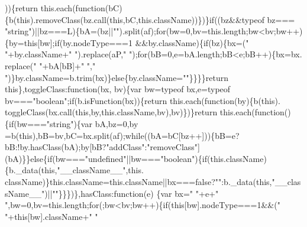 \begin{DoxyCode}
      ))\{\textcolor{keywordflow}{return} this.each(\textcolor{keyword}{function}(bC)\{b(\textcolor{keyword}{this}).removeClass(bz.call(\textcolor{keyword}{this},bC,\textcolor{keyword}{this}.className))\})\}\textcolor{keywordflow}{if}((bz&&typeof bz===\textcolor{stringliteral}{
      "string"})||bz===L)\{bA=(bz||\textcolor{stringliteral}{""}).split(af);\textcolor{keywordflow}{for}(bw=0,bv=this.length;bw<bv;bw++)\{by=\textcolor{keyword}{this}[bw];\textcolor{keywordflow}{if}(by.nodeType===1
      &&by.className)\{\textcolor{keywordflow}{if}(bz)\{bx=(\textcolor{stringliteral}{" "}+by.className+\textcolor{stringliteral}{" "}).replace(aP,\textcolor{stringliteral}{" "});\textcolor{keywordflow}{for}(bB=0,e=bA.length;bB<e;bB++)\{bx=bx.
      replace(\textcolor{stringliteral}{" "}+bA[bB]+\textcolor{stringliteral}{" "},\textcolor{stringliteral}{" "})\}by.className=b.trim(bx)\}\textcolor{keywordflow}{else}\{by.className=\textcolor{stringliteral}{""}\}\}\}\}\textcolor{keywordflow}{return} \textcolor{keyword}{this}\},toggleClass:\textcolor{keyword}{function}(bx,
      bv)\{var bw=typeof bx,e=typeof bv===\textcolor{stringliteral}{"boolean"};\textcolor{keywordflow}{if}(b.isFunction(bx))\{\textcolor{keywordflow}{return} this.each(\textcolor{keyword}{function}(by)\{b(\textcolor{keyword}{this}).
      toggleClass(bx.call(\textcolor{keyword}{this},by,\textcolor{keyword}{this}.className,bv),bv)\})\}\textcolor{keywordflow}{return} this.each(\textcolor{keyword}{function}()\{\textcolor{keywordflow}{if}(bw===\textcolor{stringliteral}{"string"})\{var bA,bz=0,by
      =b(\textcolor{keyword}{this}),bB=bv,bC=bx.split(af);\textcolor{keywordflow}{while}((bA=bC[bz++]))\{bB=e?bB:!by.hasClass(bA);by[bB?\textcolor{stringliteral}{"addClass"}:\textcolor{stringliteral}{"removeClass"}]
      (bA)\}\}\textcolor{keywordflow}{else}\{\textcolor{keywordflow}{if}(bw===\textcolor{stringliteral}{"undefined"}||bw===\textcolor{stringliteral}{"boolean"})\{\textcolor{keywordflow}{if}(this.className)\{b.\_data(\textcolor{keyword}{this},\textcolor{stringliteral}{"\_\_className\_\_"},this.
      className)\}this.className=this.className||bx===\textcolor{keyword}{false}?\textcolor{stringliteral}{""}:b.\_data(\textcolor{keyword}{this},\textcolor{stringliteral}{"\_\_className\_\_"})||\textcolor{stringliteral}{""}\}\}\})\},hasClass:\textcolor{keyword}{function}(e)
      \{var bx=\textcolor{stringliteral}{" "}+e+\textcolor{stringliteral}{" "},bw=0,bv=this.length;\textcolor{keywordflow}{for}(;bw<bv;bw++)\{\textcolor{keywordflow}{if}(\textcolor{keyword}{this}[bw].nodeType===1&&(\textcolor{stringliteral}{" "}+\textcolor{keyword}{this}[bw].className+\textcolor{stringliteral}{" "}

\end{DoxyCode}
